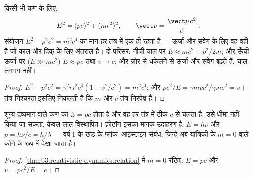 \begin{theorem}[ऊर्जा--संवेग संबंध]\label{thm:b3:relativistic-dynamics:relation}
किसी भी कण के लिए,
\[
E^2 = (pc)^2 + (mc^2)^2 ,
\qquad
\vect v = \frac{\vect p\,c^2}{E} :
\]
संयोजन $E^2 - p^2c^2 = m^2c^4$ का मान हर तंत्र में एक ही रहता है ---
ऊर्जा और संवेग के लिए वह वही है जो काल और दिक् के लिए अंतराल है।
दो परिसर: नीची चाल पर $E \approx mc^2 + p^2/2m$; और
ऊँची ऊर्जा पर ($E \gg mc^2$) $E \approx pc$ तथा $v \to c$: और ज़ोर से
धकेलने से ऊर्जा और संवेग बढ़ते हैं, चाल लगभग नहीं।
\end{theorem}

\begin{proof}
$E^2 - p^2c^2 = \gamma^2m^2c^4(1 - v^2/c^2) = m^2c^4$; और $pc^2/E =
\gamma mvc^2/\gamma mc^2 = v$। तंत्र-निश्चरता इसलिए निकलती है कि $m$
और $c$ तंत्र-निरपेक्ष हैं।
\end{proof}

\begin{proposition}[द्रव्यमानहीन कण]\label{prop:b3:relativistic-dynamics:massless}
शून्य द्रव्यमान वाले कण का $E = pc$ होता है और वह हर तंत्र में ठीक
$c$ से चलता है; उसे धीमा नहीं किया जा सकता, केवल लाल-विस्थापित। फ़ोटॉन
इसका मानक उदाहरण है: $E = h\nu$ और $p = h\nu/c = h/\lambda$ ---
वर्ष 1 के खंड के प्लांक--आइंस्टाइन संबंध, जिन्हें अब यांत्रिकी के
$m = 0$ वाले कोने के रूप में देखा जाता है।
\end{proposition}

\begin{proof}
\cref{thm:b3:relativistic-dynamics:relation} में $m = 0$ रखिए: $E = pc$
और $v = pc^2/E = c$।
\end{proof}

